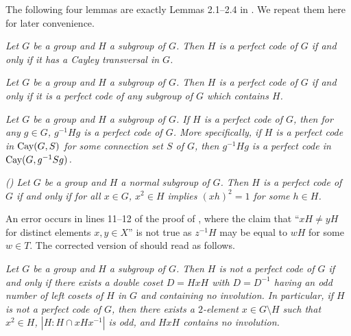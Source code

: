\documentclass[12pt, a4paper]{article}
\theoremstyle{definition}
\def\Cay{\hbox{\rm Cay}}
\newenvironment{manualtheorem}[1]{%
  \renewcommand\themanualtheoreminner{#1}%
  \manualtheoreminner
}{\endmanualtheoreminner}
\newenvironment{manuallemma}[1]{%
  \renewcommand\themanuallemmainner{#1}%
  \manuallemmainner
}{\endmanuallemmainner}
\begin{document}
The following four lemmas are exactly Lemmas 2.1--2.4 in \cite{ZZ21}. We repeat them here for later convenience.

\begin{manuallemma}{2.1}
\label{Ct}
{\em Let $G$ be a group and $H$ a subgroup of $G$. Then $H$ is a perfect code of $G$ if and only if it has a Cayley transversal in $G$.}
\end{manuallemma}

\begin{manuallemma}{2.2}
\label{sub}
{\em Let $G$ be a group and $H$ a subgroup of $G$. Then $H$ is a perfect code of $G$ if and only if it is a perfect code of any subgroup of $G$ which contains $H$.}
\end{manuallemma}

\begin{manuallemma}{2.3}
\label{conjugate}
{\em Let $G$ be a group and $H$ a subgroup of $G$. If $H$ is a perfect code of $G$, then for any $g \in G$, $g^{-1}Hg$ is a perfect code of $G$. More specifically, if $H$ is a perfect code in $\Cay(G, S)$ for some connection set $S$ of $G$, then $g^{-1}Hg$ is a perfect code in $\Cay(G, g^{-1}Sg)$.}
\end{manuallemma}

\begin{manuallemma}{2.4}
\label{HXZ}
{\em (\cite[Theorem 2.2]{HXZ18}) Let $G$ be a group and $H$ a normal subgroup of $G$. Then $H$ is a perfect code of $G$ if and only if for all $x\in G$, $x^{2}\in H$ implies $(xh)^{2}=1$ for some $h\in H$.}
\end{manuallemma}

An error occurs in lines 11--12 of the proof of \cite[Theorem 3.1]{ZZ21}, where the claim that ``$xH\neq yH$ for distinct elements $x, y \in X$'' is not true as $z^{-1}H$ may be equal to $wH$ for some $w\in T$. The corrected version of \cite[Theorem 3.1]{ZZ21} should read as follows.

\begin{manualtheorem}{3.1}
\label{basic}
{\em Let $G$ be a group and $H$ a subgroup of $G$. Then $H$ is not a perfect code of $G$ if and only if
there exists a double coset $D=HxH$ with $D=D^{-1}$ having an odd number of left cosets of $H$ in $G$ and containing no involution.
In particular, if $H$ is not a perfect code of $G$, then there exists a $2$-element $x\in G\setminus H$ such that $x^{2}\in H$, $|H:H\cap xHx^{-1}|$ is odd, and $HxH$ contains no involution.}
\end{manualtheorem}
\end{document}
